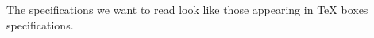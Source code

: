 The specifications we want to read look like those appearing in {\TeX}
boxes specifications.

\def\getoptspecreset{%
  \let\getoptspecvoid\empty
  \let\getoptspecmandatory\empty
  \let\getoptspecbracket\empty
}

\def\getoptspec@P#1{%
  \beginnext
  \let\next\@false
  \ifcat A\noexpand#1\let\next\@true\fi
  \endnext
}

\def\getoptspec{%
  \beginnext
  \readtokens\getoptspec@P\to\rtA\then\getoptspec@L\done
}

\def\getoptspec@A#1#2{%
  \ifflag\else
    \beginnext
    \rtB={\toksloadalistvalue#1}%
    \rtC={\to\rtB}%
    \edef\next{\the\rtB{\the\rtA}\the\rtC}%
    \endnext
    \ifexception\else
      \flagtrue
      \rtD{#2}%
    \fi
  \fi
}

\def\getoptspec@L{%
  \flagfalse
  \rtD{\getoptspec@E}%
  \getoptspec@A\getoptspecvoid\getoptspec@V
  \getoptspec@A\getoptspecmandatory\getoptspec@M
  \getoptspec@A\getoptspecbracket\getoptspec@B
  \ifflag
    \edef\next{%
      \noexpand\readblanks
      \noexpand\then
      \the\rtD
      \noexpand\done
    }%
  \else
    \def\next{\the\rtD}%
  \fi
  \next
}

\def\getoptspec@E{%
  \edef\next{\the\rtA}%
  \endnext
}

\def\getoptspec@V{%
  \edef\next{\the\rtB}%
  \endnext
  \getoptspec
}

\def\getoptspec@M{%
  \edef\next{\the\rtB}%
  \endnext
}

\def\getoptspec@B{%
  \getoptbracket\getoptspec@C
}

\def\getoptspec@C#1{%
  \rtA={#1}%
  \edef\next{\the\rtB{\the\rtA}\noexpand\getoptspec@S}%
  \endnext
}

\def\getoptspec@S{%
  \readblanks\then\getoptspec\done
}

\def\getoptspec@R{%
  \afterassignment\getoptspec@S
}

%
%

